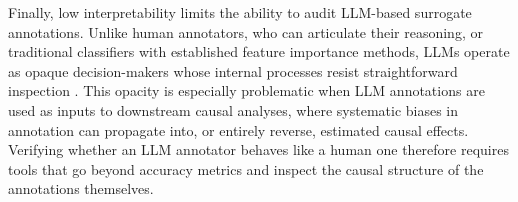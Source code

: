 Finally, low interpretability limits the ability to audit LLM-based surrogate annotations. Unlike human annotators, who can articulate their reasoning, or traditional classifiers with established feature importance methods, LLMs operate as opaque decision-makers whose internal processes resist straightforward inspection \citep{moraffah2020causal}. This opacity is especially problematic when LLM annotations are used as inputs to downstream causal analyses, where systematic biases in annotation can propagate into, or entirely reverse, estimated causal effects. Verifying whether an LLM annotator behaves like a human one therefore requires tools that go beyond accuracy metrics and inspect the causal structure of the annotations themselves.
